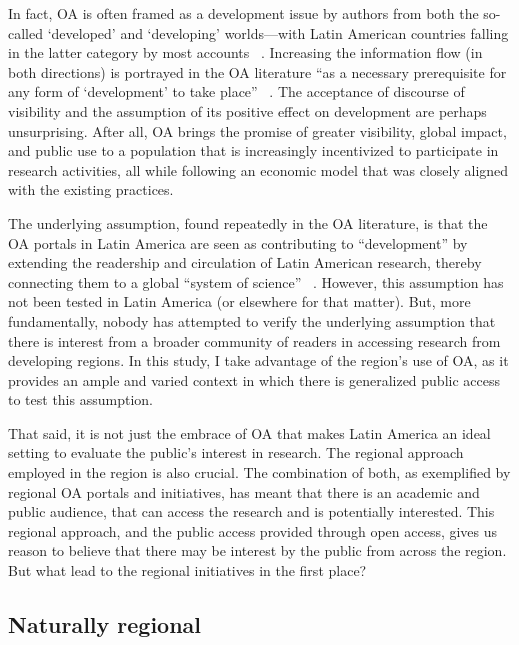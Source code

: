 In fact, OA is often framed as a development issue by authors from both the so-called `developed' and `developing' worlds—with Latin American countries falling in the latter category by most accounts ~\citep{Arunachalam2003a,Chan2006a,Packer2007,Guedon2008a}. Increasing the information flow (in both directions) is portrayed in the OA literature ``as a necessary prerequisite for any form of `development' to take place'' ~\citep[p. 453]{haider2007}. The acceptance of discourse of visibility and the assumption of its positive effect on development are perhaps unsurprising. After all, OA brings the promise of greater visibility, global impact, and public use to a population that is increasingly incentivized to participate in research activities, all while following an economic model that was closely aligned with the existing practices.

The underlying assumption, found repeatedly in the OA literature, is that the OA portals in Latin America are seen as contributing to ``development'' by extending the readership and circulation of Latin American research, thereby connecting them to a global ``system of science'' ~\citep{Packer2007,AguadoLopez2008,Guedon2008a,Troncoso2012a,Vessuri2013}. However, this assumption has not been tested in Latin America (or elsewhere for that matter). But, more fundamentally, nobody has attempted to verify the underlying assumption that there is interest from a broader community of readers in accessing research from developing regions. In this study, I take advantage of the region's use of OA, as it provides an ample and varied context in which there is generalized public access to test this assumption.

That said, it is not just the embrace of OA that makes Latin America an ideal setting to evaluate the public's interest in research. The regional approach employed in the region is also crucial. The combination of both, as exemplified by regional OA portals and initiatives, has meant that there is an academic and public audience, that can access the research and is potentially interested. This regional approach, and the public access provided through open access, gives us reason to believe that there may be interest by the public from across the region. But what lead to the regional initiatives in the first place?

\subsection{Naturally regional}
\label{naturallyregional}

